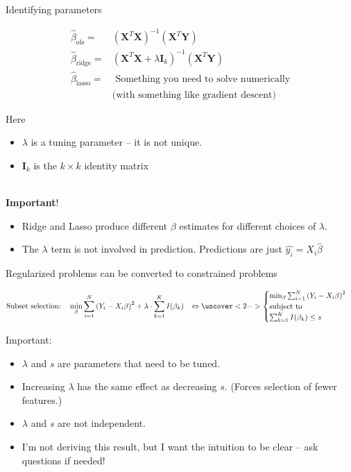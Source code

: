 \documentclass[mathserif, handout, aspectratio=169]{beamer}
\begin{document}
\begin{frame}{Identifying parameters}

\begin{align*}
\hat{\beta}_\text{ols} = & \left(\mathbf{X}^T\mathbf{X}\right)^{-1} \left(\mathbf{X}^T\mathbf{Y}\right)\\
\hat{\beta}_\text{ridge} =& \left(\mathbf{X}^T\mathbf{X} + \lambda\mathbf{I}_k\right)^{-1} \left(\mathbf{X}^T\mathbf{Y}\right)\\
\hat{\beta}_\text{lasso}  =& \text{ Something you need to solve numerically} \\
&\text{(with something like gradient descent)}
\end{align*}

Here 
\begin{itemize}
\item $\lambda$ is a tuning parameter -- it is not unique.  
\item $\mathbf{I}_k$ is the $k\times k$ identity matrix\\~\\
\end{itemize}
\vspace{-1mm}
\pause
\textbf{Important}! 
\begin{itemize}
	\item Ridge and Lasso produce different $\beta$ estimates for different choices of $\lambda$.
	\item  The $\lambda$ term is not involved in prediction.  Predictions are just $\hat{y_i} =  X_i \hat{\beta}$
\end{itemize}
\end{frame}

\begin{frame}{Regularized problems can be converted to constrained problems}

\begin{align*}
\text{Subset selection:} \quad &\min_\beta \sum_{i=1}^N \left(Y_i - X_i \beta \right)^2+\lambda \cdot \sum_{k=1}^K I(\beta_k)
&\Leftrightarrow
\uncover<2->{\begin{cases}
\min_\beta \sum_{i=1}^N \left(Y_i - X_i \beta \right)^2\\
\text{subject to}\\
\sum_{k=1}^K I(\beta_k) \le s
\end{cases}}
\end{align*}

\pause
Important: 
\begin{itemize}
\item $\lambda$ and $s$ are parameters that need to be tuned. 
\item Increasing $\lambda$ has the same effect as decreasing $s$.  (Forces selection of fewer features.)
\item $\lambda$ and $s$ are not independent.  
\item I'm not deriving this result, but I want the intuition to be clear -- ask questions if needed!
\end{itemize}

\end{frame}
\end{document}
